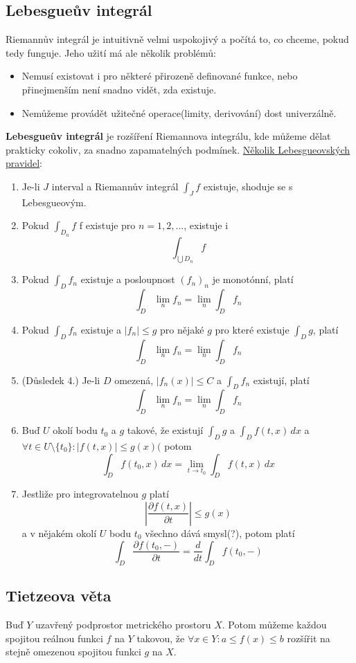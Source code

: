 \documentclass[../main.tex]{subfiles}
\begin{document}
\subsection{Lebesgueův integrál}
\hspace{1.2mm}
Riemannův integrál je intuitivně velmi uspokojivý a počítá to, co chceme, pokud tedy funguje.
Jeho užití má ale několik problémů:
\begin{itemize}
    \item Nemusí existovat i pro některé přirozeně definované funkce, nebo
    přinejmenším není snadno vidět, zda existuje.
    \item Nemůžeme provádět užitečné operace(limity, derivování) dost univerzálně.
\end{itemize}
\textbf{Lebesgueův integrál} je rozšíření Riemannova integrálu, kde můžeme dělat prakticky cokoliv,
za snadno zapamatelných podmínek.
\underline{Několik Lebesgueovských pravidel}:
\begin{enumerate}
    \item Je-li $J$ interval a Riemannův integrál $\int_{J} f$ existuje, shoduje se s Lebesgueovým.
    \item Pokud $ \int_{D_n} f $ f existuje pro $n = 1, 2, ...$, existuje i \[\int_{\bigcup D_n} f\]
    \item Pokud $ \int_{D} f_n $ existuje a posloupnost $(f_n)_n$ je monotónní, platí
    \[ \int_D \lim_n f_n = \lim_n \int_D f_n \]
    \item Pokud $\int_D f_n$ existuje a $|f_n|\leq g$ pro nějaké $g$ pro které existuje
    $\int_D g$, platí
    \[ \int_D \lim_n f_n = \lim_n \int_D f_n \]
    \item (Důsledek 4.) Je-li $D$ omezená, $|f_n(x)| \leq C$ a $\int_D f_n$ existují, platí
    \[ \int_D \lim_n f_n = \lim_n \int_D f_n \]
    \item Buď $U$ okolí bodu $t_0$ a $g$ takové, že existují $\int_D g$ a $\int_D f(t,x)\,dx$ a
    $\forall t \in U\textrm{\textbackslash}\{t_0\}: |f(t,x)|\leq g(x)($ potom
    \[ \int_D f(t_0, x)\,dx = \lim_{t\to t_0} \int_D f(t,x)\,dx \]
    \item Jestliže pro integrovatelnou $g$ platí
    \[ \left| \frac{\partial f(t,x)}{\partial t} \right| \leq g(x) \]
    a v nějakém okolí $U$ bodu $t_0$ všechno dává smysl(?), potom platí
    \[ \int_D \frac{\partial f(t_0,-)}{\partial t} = \frac{d}{dt} \int_D f(t_0, -)\]
\end{enumerate}


\subsection{Tietzeova věta}
\hspace{1.2mm}
Buď $Y$ uzavřený podprostor metrického prostoru $X$. Potom můžeme každou spojitou reálnou
funkci $f$ na $Y$ takovou, že $\forall x \in Y: a \leq f(x) \leq b$ rozšířit na stejně omezenou
spojitou funkci $g$ na $X$.
\end{document}
